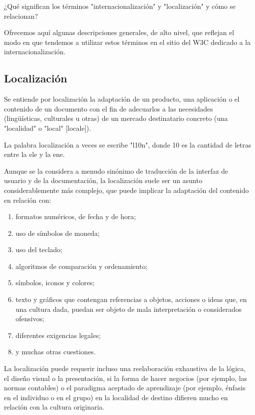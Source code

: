 \begin{enumerate}
\cite{w3}¿Qué significan los términos "internacionalización" y "localización" y cómo se relacionan?

Ofrecemos aquí algunas descripciones generales, de alto nivel, que reflejan el modo en que tendemos a utilizar estos términos en el sitio del W3C dedicado a la internacionalización.

\subsection{Localización}

Se entiende por localización la adaptación de un producto, una aplicación o el contenido de un documento con el fin de adecuarlos a las necesidades (lingüísticas, culturales u otras) de un mercado destinatario concreto (una "localidad" o "local" [locale]).

\begin{remark}
	La palabra localización a veces se escribe "l10n", donde 10 es la cantidad de letras entre la ele y la ene.
\end{remark}


Aunque se la considera a menudo sinónimo de traducción de la interfaz de usuario y de la documentación, la localización suele ser un asunto considerablemente más complejo, que puede implicar la adaptación del contenido en relación con:

\begin{enumerate}
	\item formatos numéricos, de fecha y de hora;
	\item uso de símbolos de moneda;
	\item uso del teclado;
	\item algoritmos de comparación y ordenamiento;
	\item símbolos, iconos y colores;
	\item texto y gráficos que contengan referencias a objetos, acciones o ideas que, en una cultura dada, puedan ser objeto de mala interpretación o considerados ofensivos;
	\item diferentes exigencias legales;
	\item y muchas otras cuestiones.
\end{enumerate}

La localización puede requerir incluso una reelaboración exhaustiva de la lógica, el diseño visual o la presentación, si la forma de hacer negocios (por ejemplo, las normas contables) o el paradigma aceptado de aprendizaje (por ejemplo, énfasis en el individuo o en el grupo) en la localidad de destino difieren mucho en relación con la cultura originaria.


\end{enumerate}
